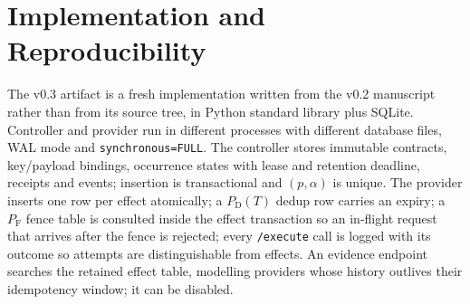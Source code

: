 \documentclass[conference,10pt]{IEEEtran}
\newcommand{\PDT}{P_{\mathrm{D}}(T)}
\newcommand{\PF}{P_{\mathrm{F}}}
\begin{document}
\section{Implementation and Reproducibility}

The v0.3 artifact is a fresh implementation written from the v0.2 manuscript rather than from its source tree, in Python standard library plus SQLite. Controller and provider run in different processes with different database files, WAL mode and \texttt{synchronous=FULL}. The controller stores immutable contracts, key/payload bindings, occurrence states with lease and retention deadline, receipts and events; insertion is transactional and $(p,\alpha)$ is unique. The provider inserts one row per effect atomically; a $\PDT$ dedup row carries an expiry; a $\PF$ fence table is consulted inside the effect transaction so an in-flight request that arrives after the fence is rejected; every \texttt{/execute} call is logged with its outcome so attempts are distinguishable from effects. An evidence endpoint searches the retained effect table, modelling providers whose history outlives their idempotency window; it can be disabled.
\end{document}
